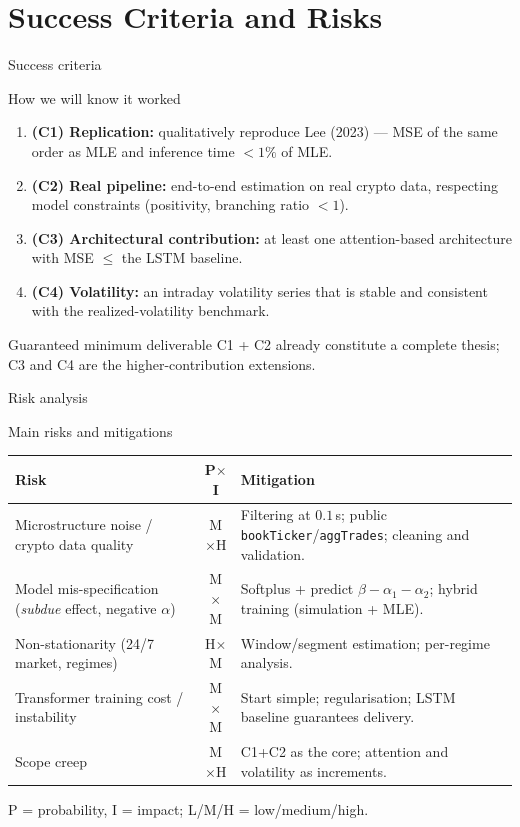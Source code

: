 \documentclass[aspectratio=169]{beamer}
\begin{document}
\section{Success Criteria and Risks}
\begin{frame}{Success criteria}
  \begin{block}{How we will know it worked}
    \begin{enumerate}\small
      \item \textbf{(C1) Replication:} qualitatively reproduce Lee (2023) — MSE of the same order as MLE and inference time $<1\%$ of MLE.
      \item \textbf{(C2) Real pipeline:} end-to-end estimation on real crypto data, respecting model constraints (positivity, branching ratio $<1$).
      \item \textbf{(C3) Architectural contribution:} at least one attention-based architecture with MSE \textbf{$\le$} the LSTM baseline.
      \item \textbf{(C4) Volatility:} an intraday volatility series that is stable and consistent with the realized-volatility benchmark.
    \end{enumerate}
  \end{block}
  \begin{alertblock}{Guaranteed minimum deliverable}
    \footnotesize C1 + C2 already constitute a complete thesis; C3 and C4 are the higher-contribution extensions.
  \end{alertblock}
\end{frame}

\begin{frame}{Risk analysis}
  \begin{block}{Main risks and mitigations}
    \footnotesize
    \begin{tabular}{p{4.6cm}cp{5.2cm}}
      \toprule
      \textbf{Risk} & \textbf{P$\times$I} & \textbf{Mitigation} \\
      \midrule
      Microstructure noise / crypto data quality & M$\times$H & Filtering at $0.1$\,s; public \texttt{bookTicker}/\texttt{aggTrades}; cleaning and validation. \\
      Model mis-specification (\emph{subdue} effect, negative $\alpha$) & M$\times$M & Softplus + predict $\beta-\alpha_1-\alpha_2$; hybrid training (simulation + MLE). \\
      Non-stationarity (24/7 market, regimes) & H$\times$M & Window/segment estimation; per-regime analysis. \\
      Transformer training cost / instability & M$\times$M & Start simple; regularisation; LSTM baseline guarantees delivery. \\
      Scope creep & M$\times$H & C1+C2 as the core; attention and volatility as increments. \\
      \bottomrule
    \end{tabular}
  \end{block}
  {\scriptsize P = probability, I = impact; L/M/H = low/medium/high.}
\end{frame}
\end{document}
